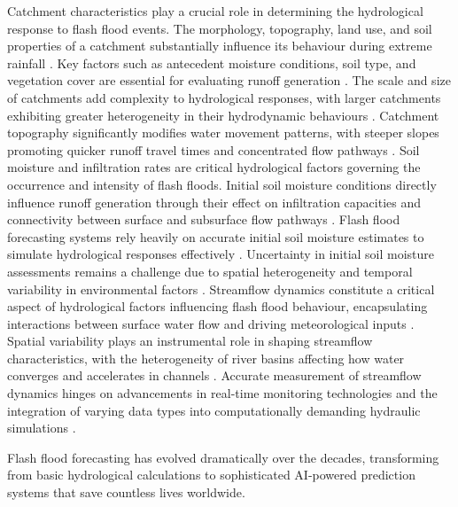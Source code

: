 Catchment characteristics play a crucial role in determining the hydrological response to flash flood events. The morphology, topography, land use, and soil properties of a catchment substantially influence its behaviour during extreme rainfall \citep{HenaoSalgado_2022, Duan_2022}. Key factors such as antecedent moisture conditions, soil type, and vegetation cover are essential for evaluating runoff generation \citep{Ma_2019, Zhai_2018}. The scale and size of catchments add complexity to hydrological responses, with larger catchments exhibiting greater heterogeneity in their hydrodynamic behaviours \citep{Luong_2021}. Catchment topography significantly modifies water movement patterns, with steeper slopes promoting quicker runoff travel times and concentrated flow pathways \citep{Maqtan_2022}. Soil moisture and infiltration rates are critical hydrological factors governing the occurrence and intensity of flash floods. Initial soil moisture conditions directly influence runoff generation through their effect on infiltration capacities and connectivity between surface and subsurface flow pathways \citep{Yatheendradas_2008}. Flash flood forecasting systems rely heavily on accurate initial soil moisture estimates to simulate hydrological responses effectively \citep{Yatheendradas_2008, AlRawas_2024a, Xing_2019}. Uncertainty in initial soil moisture assessments remains a challenge due to spatial heterogeneity and temporal variability in environmental factors \citep{Yatheendradas_2008, AlRawas_2024}. Streamflow dynamics constitute a critical aspect of hydrological factors influencing flash flood behaviour, encapsulating interactions between surface water flow and driving meteorological inputs \citep{Yang_2022}. Spatial variability plays an instrumental role in shaping streamflow characteristics, with the heterogeneity of river basins affecting how water converges and accelerates in channels \citep{Zhang_2024b}. Accurate measurement of streamflow dynamics hinges on advancements in real-time monitoring technologies and the integration of varying data types into computationally demanding hydraulic simulations \citep{Msigwa_2024, Barthold_2015}.

Flash flood forecasting has evolved dramatically over the decades, transforming from basic hydrological calculations to sophisticated AI-powered prediction systems that save countless lives worldwide.

